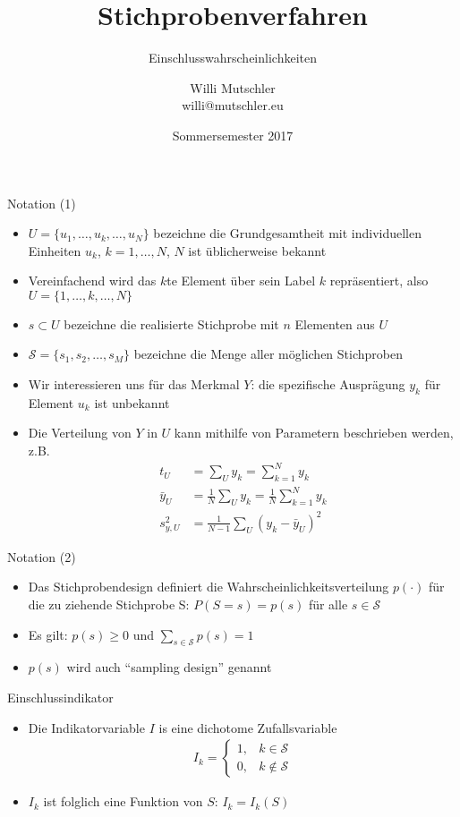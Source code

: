 \documentclass[9pt]{beamer}
\title{Stichprobenverfahren}
\subtitle{Einschlusswahrscheinlichkeiten}
\date[SS2017]{Sommersemester 2017}
\author{Willi Mutschler\\willi@mutschler.eu}
\begin{document}
\maketitle


\begin{frame}{Notation (1)}
\begin{itemize}
	\item $U=\{u_1,\dots,u_k,\dots,u_N\}$ bezeichne die Grundgesamtheit mit individuellen Einheiten $u_k$, $k=1,\dots,N$, $N$ ist üblicherweise bekannt
	\item Vereinfachend wird das $k$te Element über sein Label $k$ repräsentiert, also $U=\{1,\dots,k,\dots,N\}$
	\item $s\subset U$ bezeichne die realisierte Stichprobe mit $n$ Elementen aus $U$
	\item $\mathcal{S}=\{s_1,s_2,\dots,s_M\}$ bezeichne die Menge aller möglichen Stichproben
	\item Wir interessieren uns für das Merkmal $Y$: die spezifische Ausprägung $y_k$ für Element $u_k$ ist unbekannt
	\item Die Verteilung von $Y$ in $U$ kann mithilfe von Parametern beschrieben werden, z.B.
	\begin{align*}
	t_U &= \sum_U y_k = \sum_{k=1}^{N} y_k\\
	\bar{y}_U &= \frac{1}{N}\sum_U y_k = \frac{1}{N}\sum_{k=1}^N y_k\\
	s^2_{y,U} &= \frac{1}{N-1}\sum_U(y_k-\bar{y}_U)^2
	\end{align*}
\end{itemize}
\end{frame}

\begin{frame}{Notation (2)}
\begin{itemize}
	\item Das Stichprobendesign definiert die Wahrscheinlichkeitsverteilung $p(\cdot)$ 	für die zu ziehende Stichprobe S: $P(S=s)=p(s)$ für alle $s\in \mathcal{S}$
	\item Es gilt: $p(s)\geq0$ und $\sum_{s\in \mathcal{S}}p(s)=1$
	\item $p(s)$ wird auch \enquote{sampling design} genannt
\end{itemize}
\end{frame}

\begin{frame}{Einschlussindikator}
\begin{itemize}
	\item Die Indikatorvariable $I$ is eine dichotome Zufallsvariable
	\begin{align*}
	I_k = \begin{cases}
	1, & k\in \mathcal{S}\\
	0, & k \notin \mathcal{S}
	\end{cases}
	\end{align*}
	\item $I_k$ ist folglich eine Funktion von $S$: $I_k=I_k(S)$
\end{itemize}
\end{frame}
\end{document}
